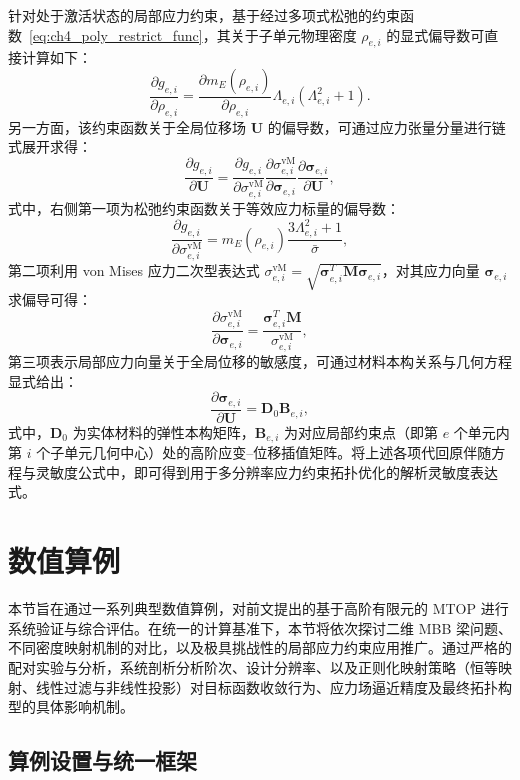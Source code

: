 针对处于激活状态的局部应力约束，基于经过多项式松弛的约束函数~\eqref{eq:ch4_poly_restrict_func}，其关于子单元物理密度 $\rho_{e,i}$ 的显式偏导数可直接计算如下：
\[
\frac{\partial g_{e,i}}{\partial\rho_{e,i}} = \frac{\partial m_E(\rho_{e,i})}{\partial\rho_{e,i}}\Lambda_{e,i}(\Lambda_{e,i}^2 + 1).
\]
另一方面，该约束函数关于全局位移场 $\boldsymbol{U}$ 的偏导数，可通过应力张量分量进行链式展开求得：
\[
\frac{\partial g_{e,i}}{\partial \boldsymbol{U}} = \frac{\partial g_{e,i}}{\partial\sigma_{e,i}^{\text{vM}}} \frac{\partial\sigma_{e,i}^{\text{vM}}}{\partial\boldsymbol{\sigma}_{e,i}} \frac{\partial\boldsymbol{\sigma}_{e,i}}{\partial \boldsymbol{U}},
\]
式中，右侧第一项为松弛约束函数关于等效应力标量的偏导数：
\[
\frac{\partial g_{e,i}}{\partial\sigma_{e,i}^{\text{vM}}} = m_E(\rho_{e,i})\frac{3\Lambda_{e,i}^2 + 1}{\bar{\sigma}},
\]
第二项利用 von Mises 应力二次型表达式 $\sigma_{e,i}^{\text{vM}} = \sqrt{\boldsymbol{\sigma}_{e,i}^T \boldsymbol{M} \boldsymbol{\sigma}_{e,i}}$，对其应力向量 $\boldsymbol{\sigma}_{e,i}$ 求偏导可得：
\[
\frac{\partial\sigma_{e,i}^{\text{vM}}}{\partial\boldsymbol{\sigma}_{e,i}} = \frac{\boldsymbol{\sigma}_{e,i}^T \boldsymbol{M}}{\sigma_{e,i}^{\text{vM}}},
\]
第三项表示局部应力向量关于全局位移的敏感度，可通过材料本构关系与几何方程显式给出：
\[
\frac{\partial\boldsymbol{\sigma}_{e,i}}{\partial \boldsymbol{U}} = \boldsymbol{D}_0\boldsymbol{B}_{e,i},
\]
式中，$\boldsymbol{D}_0$ 为实体材料的弹性本构矩阵，$\boldsymbol{B}_{e,i}$ 为对应局部约束点（即第 $e$ 个单元内第 $i$ 个子单元几何中心）处的高阶应变--位移插值矩阵。将上述各项代回原伴随方程与灵敏度公式中，即可得到用于多分辨率应力约束拓扑优化的解析灵敏度表达式。


\section{数值算例}
\label{sec:ch4_numerical_examples}

本节旨在通过一系列典型数值算例，对前文提出的基于高阶有限元的 MTOP 进行系统验证与综合评估。在统一的计算基准下，本节将依次探讨二维 MBB 梁问题、不同密度映射机制的对比，以及极具挑战性的局部应力约束应用推广。通过严格的配对实验与分析，系统剖析分析阶次、设计分辨率、以及正则化映射策略（恒等映射、线性过滤与非线性投影）对目标函数收敛行为、应力场逼近精度及最终拓扑构型的具体影响机制。


\subsection{算例设置与统一框架}
\label{subsec:ch4_setup_framework}

